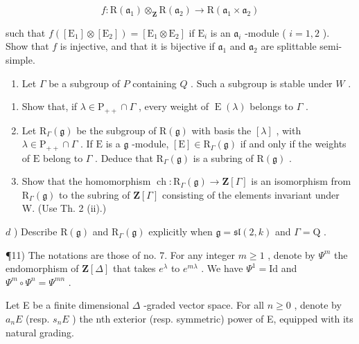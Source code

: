 \[
f: \mathrm{R} (\mathfrak {a} _ {1}) \otimes_ {\mathbf {Z}} \mathrm{R} (\mathfrak {a} _ {2}) \to \mathrm{R} (\mathfrak {a} _ {1} \times \mathfrak {a} _ {2})
\]

such that \(f([\mathrm{E}_1] \otimes [\mathrm{E}_2]) = [\mathrm{E}_1 \otimes \mathrm{E}_2]\) if \(\mathrm{E}_i\) is an \(\mathfrak{a}_i\) -module ( \(i = 1, 2\) ). Show that \(f\) is injective, and that it is bijective if \(\mathfrak{a}_1\) and \(\mathfrak{a}_2\) are splittable semi-simple.

\begin{enumerate}
\def\labelenumi{\arabic{enumi})}
\setcounter{enumi}{9}
\tightlist
\item
  Let \(\Gamma\) be a subgroup of \(P\) containing \(Q\) . Such a subgroup is stable under \(W\) .
\end{enumerate}

\begin{enumerate}
\def\labelenumi{\alph{enumi})}
\item
  Show that, if \(\lambda \in \mathrm{P}_{++} \cap \Gamma\) , every weight of \(\operatorname{E}(\lambda)\) belongs to \(\Gamma\) .
\item
  Let \(\mathrm{R}_{\Gamma}(\mathfrak{g})\) be the subgroup of \(\mathrm{R}(\mathfrak{g})\) with basis the \([\lambda]\) , with \(\lambda \in \mathrm{P}_{++} \cap \Gamma\) . If \(\mathrm{E}\) is a \(\mathfrak{g}\) -module, \([\mathrm{E}] \in \mathrm{R}_{\Gamma}(\mathfrak{g})\) if and only if the weights of \(\mathrm{E}\) belong to \(\Gamma\) . Deduce that \(\mathrm{R}_{\Gamma}(\mathfrak{g})\) is a subring of \(\mathrm{R}(\mathfrak{g})\) .
\item
  Show that the homomorphism \(\operatorname{ch} : \mathrm{R}_{\Gamma}(\mathfrak{g}) \to \mathbf{Z}[\Gamma]\) is an isomorphism from \(\mathrm{R}_{\Gamma}(\mathfrak{g})\) to the subring of \(\mathbf{Z}[\Gamma]\) consisting of the elements invariant under W. (Use Th. 2 (ii).)
\end{enumerate}

\(d\) ) Describe \(\mathrm{R}(\mathfrak{g})\) and \(\mathrm{R}_{\Gamma}(\mathfrak{g})\) explicitly when \(\mathfrak{g} = \mathfrak{sl}(2,k)\) and \(\Gamma = \mathrm{Q}\) .

¶11) The notations are those of no. 7. For any integer \(m \geq 1\) , denote by \(\Psi^{m}\) the endomorphism of \(\mathbf{Z}[\Delta]\) that takes \(e^{\lambda}\) to \(e^{m\lambda}\) . We have \(\Psi^{1} = \mathrm{Id}\) and \(\Psi^{m} \circ \Psi^{n} = \Psi^{mn}\) .

Let E be a finite dimensional \(\Delta\) -graded vector space. For all \(n \geq 0\) , denote by \(a_{n}E\) (resp. \(s_{n}E\) ) the nth exterior (resp. symmetric) power of E, equipped with its natural grading.

